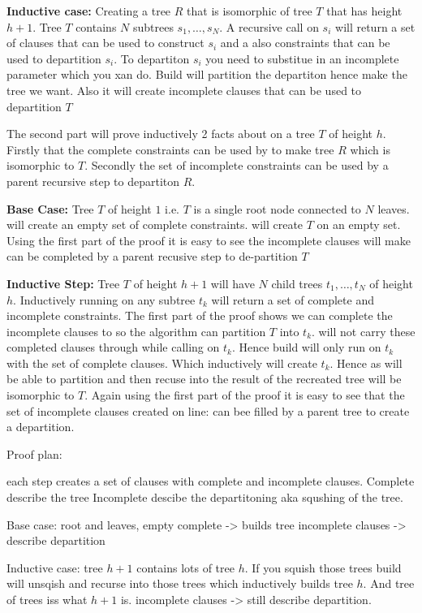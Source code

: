\textbf{Inductive case:} Creating a tree $R$ that is isomorphic of tree $T$ that has height $h+1$. Tree $T$ contains $N$ subtrees $s_1, \ldots, s_N$. A recursive call on $s_i$ will return a set of clauses that can be used to construct $s_i$ and a also constraints that can be used to departition $s_i$. To departiton $s_i$ you need to substitue in an incomplete parameter which you xan do. Build will partition the departiton hence make the tree we want. Also it will create incomplete clauses that can be used to departition $T$

The second part will prove inductively 2 facts about  on a tree $T$ of height $h$. Firstly that the complete constraints can be used by  to make tree $R$ which is isomorphic to $T$. Secondly the set of incomplete constraints can be used by a parent recursive step to departiton $R$.

\textbf{Base Case:} Tree $T$ of height $1$ i.e. $T$ is a single root node connected to $N$ leaves.   will create an empty set of complete constraints.  will create $T$ on an empty set. Using the first part of the proof it is easy to see the incomplete clauses  will make can be completed by a parent recusive step to de-partition $T$

\textbf{Inductive Step:} Tree $T$ of height $h+1$ will have $N$ child trees $t_1, \ldots, t_N$ of height $h$. Inductively running  on any subtree $t_k$ will return a set of complete and incomplete constraints. The first part of the proof shows we can complete the incomplete clauses to so the  algorithm can partition $T$ into $t_k$.  will not carry these completed clauses through while calling  on $t_k$. Hence build will only run  on $t_k$ with the set of complete clauses. Which inductively will create $t_k$. Hence as  will be able to partition and then recuse into the result of  the recreated tree will be isomorphic to $T$. Again using the first part of the proof it is easy to see that the set of incomplete clauses created on line: can bee filled by a parent tree to create a departition. 

Proof plan:

each step creates a set of clauses with complete and incomplete clauses.
Complete describe the tree
Incomplete descibe the departitoning aka squshing of the tree.

Base case: root and leaves, 
empty complete -> builds tree
incomplete clauses -> describe departition

Inductive case:
tree $h+1$ contains lots of tree $h$. If you squish those trees build will unsqish and recurse into those trees which inductively builds tree $h$. And tree of trees iss what $h+1$ is.
incomplete clauses -> still describe departition.
